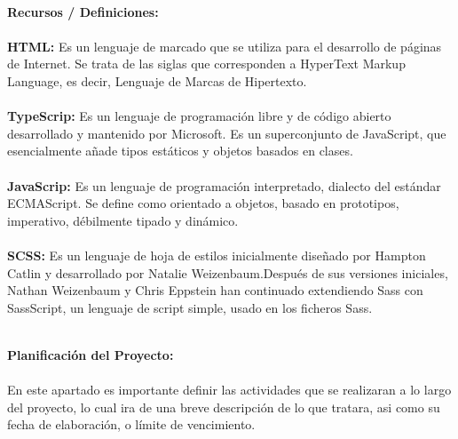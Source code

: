 \documentclass[40pt]{article}
\begin{document}
\maketitle
\textsf{\ \\
\textbf{Recursos / Definiciones:}\\
\\
\textbf{HTML:} Es un lenguaje de marcado que se utiliza para el desarrollo de páginas de Internet. Se trata de las siglas que corresponden a HyperText Markup Language, es decir, Lenguaje de Marcas de Hipertexto.
\\
\\
\textbf{TypeScrip:} Es un lenguaje de programación libre y de código abierto desarrollado y mantenido por Microsoft. Es un superconjunto de JavaScript, que esencialmente añade tipos estáticos y objetos basados en clases.
\\
\\
\textbf{JavaScrip:} Es un lenguaje de programación interpretado, dialecto del estándar ECMAScript. Se define como orientado a objetos,  basado en prototipos, imperativo, débilmente tipado y dinámico.
\\
\\
\textbf{SCSS:} Es un lenguaje de hoja de estilos inicialmente diseñado por Hampton Catlin y desarrollado por Natalie Weizenbaum.Después de sus versiones iniciales, Nathan Weizenbaum y Chris Eppstein han continuado extendiendo Sass con SassScript, un lenguaje de script simple, usado en los ficheros Sass. \\}

\maketitle
\textsf{\ \\
\textbf{Planificación del Proyecto:}\\
\\
En este apartado es importante definir las actividades que se realizaran a lo largo del proyecto, lo cual ira de una breve descripción de lo que tratara, asi como su fecha de elaboración, o límite de vencimiento. \\}
\end{document}
